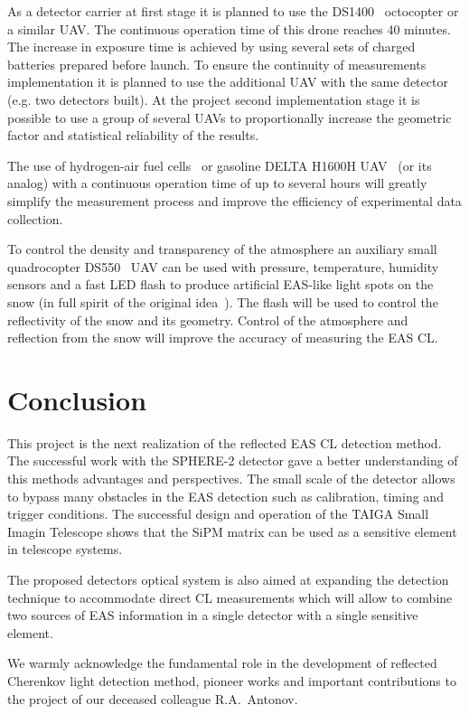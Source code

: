 \documentclass[a4paper,11pt]{article}
\begin{document}
As a detector carrier at first stage it is planned to use  the DS1400~\cite{dronestroy} octocopter or a similar UAV.
The continuous operation time of this drone reaches 40 minutes.
The increase in exposure time is achieved by using several sets of charged batteries prepared before launch. 
To ensure the continuity of measurements implementation it is planned to use the additional UAV with the same detector (e.g. two detectors built).
At the project second implementation stage it is possible to use a group of several UAVs to proportionally increase the geometric factor and statistical reliability of the results. 

The use of hydrogen-air fuel cells~\cite{UAVair} or gasoline DELTA H1600H UAV~\cite{UAVoil} (or its analog) with a continuous operation time of up to several hours will greatly simplify the measurement process and improve the efficiency of experimental data collection.

To control the density and transparency of the atmosphere an auxiliary small quadrocopter DS550~\cite{dronestroy} UAV can be used with pressure, temperature, humidity sensors and a fast LED flash to produce artificial EAS-like light spots on the snow (in full spirit of the original idea~\cite{Chu74}).
The flash will be used to control the reflectivity of the snow and its geometry. Control of the atmosphere and reflection from the snow will improve the accuracy of measuring the EAS CL.

\section{Conclusion}

This project is the next realization of the reflected EAS CL detection method. The successful work with the SPHERE-2 detector gave a better understanding of this methods advantages and perspectives. The small scale of the detector allows to bypass many obstacles in the EAS detection such as calibration, timing and trigger conditions. The successful design and operation of the TAIGA Small Imagin Telescope shows that the SiPM matrix can be used as a sensitive element in telescope systems.

The proposed detectors optical system is also aimed at expanding the detection technique to accommodate direct CL measurements which will allow to combine two sources of EAS information in a single detector with a single sensitive element.


\acknowledgments
We warmly acknowledge the fundamental role in the development of reflected Cherenkov light detection method, pioneer works and important contributions to the project of our deceased colleague R.A.~Antonov.
\end{document}

